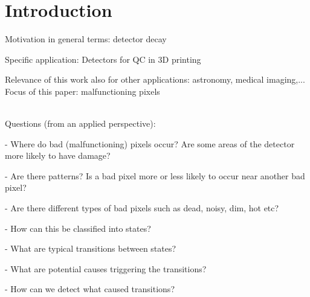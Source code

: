 \documentclass[../IO-Pixels.tex]{subfiles}
\begin{document}
\section{Introduction}

\begin{outline}
Motivation in general terms: detector decay

Specific application: Detectors for QC in 3D printing 

Relevance of this work also for other applications: astronomy, medical imaging,...
\\

Focus of this paper: malfunctioning pixels

\\
Questions (from an applied perspective):

- Where do bad (malfunctioning) pixels occur? Are some areas of the detector more likely to have damage?

- Are there patterns? Is a bad pixel more or less likely to occur near another bad pixel?

- Are there different types of bad pixels such as dead, noisy, dim, hot etc?

- How can this be classified into states?

- What are typical transitions between states? 

- What are potential causes triggering the transitions? 

- How can we detect what caused transitions?
\end{outline}



\end{document}
